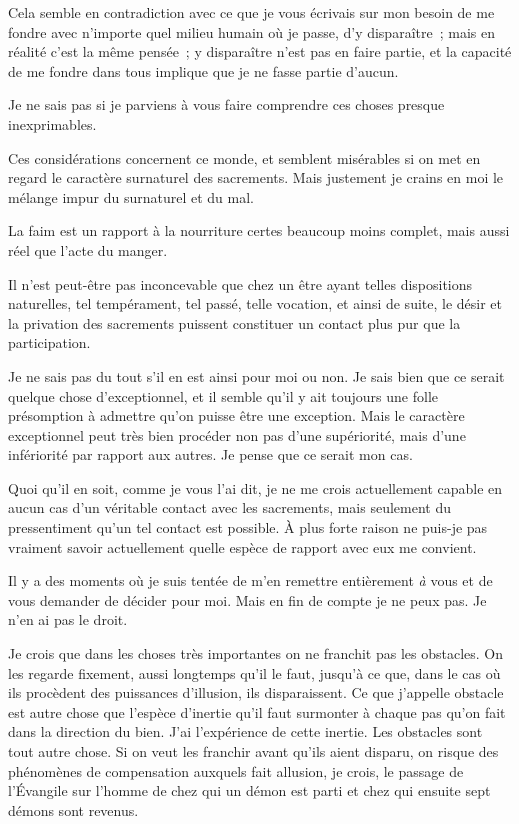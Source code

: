 \documentclass[french,twoside]{book} %
\begin{document}
Cela semble en contradiction avec ce que je vous écrivais sur mon besoin de me fondre avec n'importe quel milieu humain où je passe, d'y disparaître ; mais en réalité c'est la même pensée ; y disparaître n'est pas en faire partie, et la capacité de me fondre dans tous implique que je ne fasse partie d'aucun.\par
Je ne sais pas si je parviens à vous faire comprendre ces choses presque inexprimables.\par
Ces considérations concernent ce monde, et semblent misérables si on met en regard le caractère surnaturel des sacrements. Mais justement je crains en moi le mélange impur du surnaturel et du mal.\par
La faim est un rapport à la nourriture certes beaucoup moins complet, mais aussi réel que l'acte du manger.\par
Il n'est peut-être pas inconcevable que chez un être ayant telles dispositions naturelles, tel tempérament, tel passé, telle vocation, et ainsi de suite, le désir et la privation des sacrements puissent constituer un contact plus pur que la participation.\par
Je ne sais pas du tout s'il en est ainsi pour moi ou non. Je sais bien que ce serait quelque chose d'exceptionnel, et il semble qu'il y ait toujours une folle présomption à admettre qu'on puisse être une exception. Mais le caractère exceptionnel peut très bien procéder non pas d'une supériorité, mais d'une infériorité par rapport aux autres. Je pense que ce serait mon cas.\par
Quoi qu'il en soit, comme je vous l'ai dit, je ne me crois actuellement capable en aucun cas d'un véritable contact avec les sacrements, mais seulement du pressentiment qu'un tel contact est possible. À plus forte raison ne puis-je pas vraiment savoir actuellement quelle espèce de rapport avec eux me convient.\par
Il y a des moments où je suis tentée de m'en remettre entièrement {\itshape à} vous et de vous demander de décider pour moi. Mais en fin de compte je ne peux pas. Je n'en ai pas le droit.\par
Je crois que dans les choses très importantes on ne franchit pas les obstacles. On les regarde fixement, aussi longtemps qu'il le faut, jusqu'à ce que, dans le cas où ils procèdent des puissances d'illusion, ils disparaissent. Ce que j'appelle obstacle est autre chose que l'espèce d'inertie qu'il faut surmonter à chaque pas qu'on fait dans la direction du bien. J'ai l'expérience de cette inertie. Les obstacles sont tout autre chose. Si on veut les franchir avant qu'ils aient disparu, on risque des phénomènes de compensation auxquels fait allusion, je crois, le passage de l'Évangile sur l'homme de chez qui un démon est parti et chez qui ensuite sept démons sont revenus.\par
\end{document}
